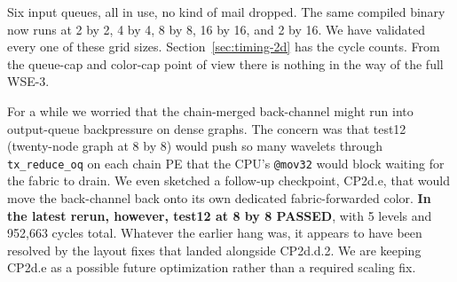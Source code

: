 \documentclass[11pt]{article}
\newcommand{\code}[1]{\texttt{#1}}
\begin{document}
\begin{center}
\end{center}

Six input queues, all in use, no kind of mail dropped. The same
compiled binary now runs at 2 by 2, 4 by 4, 8 by 8, 16 by 16,
and 2 by 16. We have validated every one of these grid sizes.
Section~\ref{sec:timing-2d} has the cycle counts. From the
queue-cap and color-cap point of view there is nothing in the
way of the full WSE-3.

For a while we worried that the chain-merged back-channel
might run into output-queue backpressure on dense graphs. The
concern was that test12 (twenty-node graph at 8 by 8) would
push so many wavelets through \code{tx\_reduce\_oq} on each
chain PE that the CPU's \code{@mov32} would block waiting for
the fabric to drain. We even sketched a follow-up checkpoint,
CP2d.e, that would move the back-channel back onto its own
dedicated fabric-forwarded color. \textbf{In the latest rerun,
however, test12 at 8 by 8 PASSED}, with 5 levels and 952{,}663
cycles total. Whatever the earlier hang was, it appears to
have been resolved by the layout fixes that landed alongside
CP2d.d.2. We are keeping CP2d.e as a possible future
optimization rather than a required scaling fix.
\end{document}
